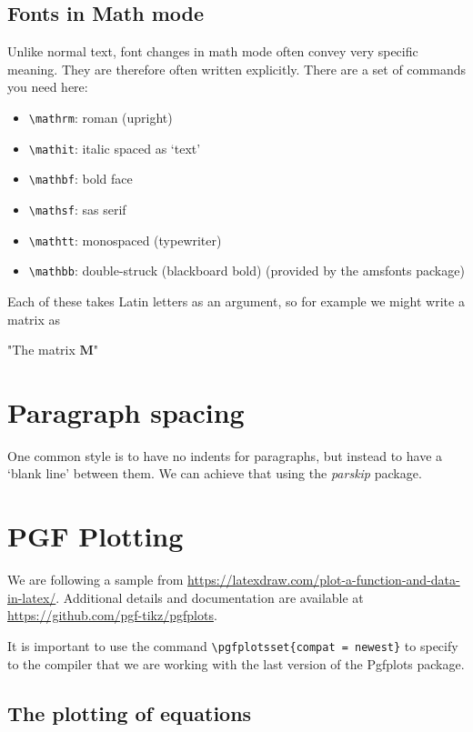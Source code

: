\documentclass[12]{article}
\begin{document}
    \subsection{Fonts in Math mode}%
    \label{sub:fonts-in-math}

    Unlike normal text, font changes in math mode often convey very specific meaning. They are therefore often written explicitly. There are a set of commands you need here:
    \begin{itemize}
        \item \verb|\mathrm|: roman (upright)
        \item \verb|\mathit|: italic spaced as ‘text’
        \item \verb|\mathbf|: bold face
        \item \verb|\mathsf|: sas serif
        \item \verb|\mathtt|: monospaced (typewriter)
        \item \verb|\mathbb|: double-struck (blackboard bold) (provided by the amsfonts package)
    \end{itemize}

    Each of these takes Latin letters as an argument, so for example we might write a matrix as

    "The matrix $\mathbf{M}$"

    \section{Paragraph spacing}%
    \label{sec:para-space}
    One common style is to have no indents for paragraphs, but instead to have a ‘blank line’ between them. We can achieve that using the \textit{parskip} package.

    \lipsum[1]

    \section{PGF Plotting}%
    \label{sec:pdf-plotting}
    We are following a sample from \url{https://latexdraw.com/plot-a-function-and-data-in-latex/}. Additional details and documentation are available at \url{https://github.com/pgf-tikz/pgfplots}.

    It is important to use the command \verb|\pgfplotsset{compat = newest}| to specify to the compiler that we are working with the last version of the Pgfplots package.

    \subsection{The plotting of equations}%
    \label{sub:plotting-figures}
\end{document}

